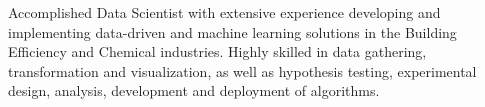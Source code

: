 

\begin{cvparagraph}

Accomplished Data Scientist with extensive experience developing and implementing data-driven and machine learning solutions in the Building Efficiency and Chemical industries. Highly skilled in data gathering, transformation and visualization, as well as hypothesis testing, experimental design, analysis, development and deployment of algorithms.

\end{cvparagraph}

